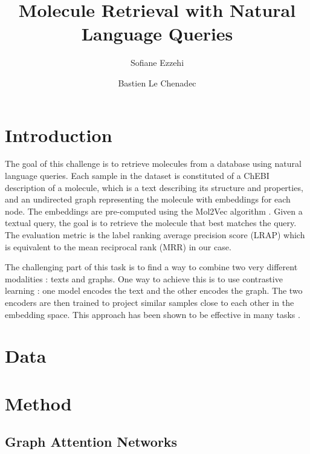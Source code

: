 \documentclass[switch, 12pt]{article}
\title{Molecule Retrieval with Natural Language Queries}
\author[1]{Sofiane Ezzehi}
\author[1]{Bastien Le Chenadec}
\affil[1]{École des Ponts ParisTech}
\begin{document}
\maketitle

\begin{contribstatement}

\end{contribstatement}
\vspace{0.35cm}

\begin{multicols}{2}
    \section{Introduction}

    The goal of this challenge is to retrieve molecules from a database using natural language queries. Each sample in the dataset is constituted of a ChEBI description of a molecule, which is a text describing its structure and properties, and an undirected graph representing the molecule with embeddings for each node. The embeddings are pre-computed using the Mol2Vec algorithm \cite{mol2vec}. Given a textual query, the goal is to retrieve the molecule that best matches the query. The evaluation metric is the label ranking average precision score (LRAP) which is equivalent to the mean reciprocal rank (MRR) in our case.

    The challenging part of this task is to find a way to combine two very different modalities : texts and graphs. One way to achieve this is to use contrastive learning : one model encodes the text and the other encodes the graph. The two encoders are then trained to project similar samples close to each other in the embedding space. This approach has been shown to be effective in many tasks \cite{chen-2020,gao-2021}.

    \section{Data}

    \section{Method}

    \subsection{Graph Attention Networks}

    \cite{velickovic-2018}


\end{multicols}
\end{document}
